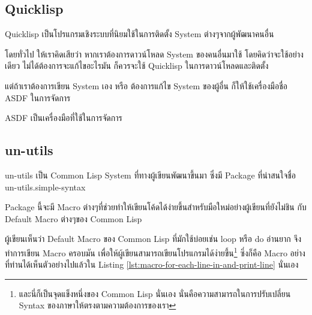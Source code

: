 \documentclass[a4paper]{article}
\begin{document}
\subsection{Quicklisp}

Quicklisp เป็นโปรแกรมเชิงระบบที่นิยมใช้ในการติดตั้ง System ต่างๆจากผู้พัฒนาคนอื่น

โดยทั่วไป ให้เราคิดเสียว่า หากเราต้องการดาวน์โหลด System ของคนอื่นมาใช้
โดยคิดว่าจะใช้อย่างเดียว ไม่ได้ต้องการจะแก้ไขอะไรมัน ก็ควรจะใช้ Quicklisp
ในการดาวน์โหลดและติดตั้ง

แต่ถ้าเราต้องการเขียน System เอง หรือ ต้องการแก้ไข System ของผู้อื่น ก็ให้ใช้เครื่องมือชื่อ
ASDF ในการจัดการ

ASDF เป็นเครื่องมือที่ใช้ในการจัดการ

\subsection{un-utils}

un-utils เป็น Common Lisp System ที่ทางผู้เขียนพัฒนาขึ้นมา ซึ่งมี Package ที่น่าสนใจชื่อ
un-utils.simple-syntax

Package นี้จะมี Macro ต่างๆที่ช่วยทำให้เขียนโค้ดได้ง่ายขึ้นสำหรับมือใหม่อย่างผู้เขียนที่ยังไม่ชิน%
กับ Default Macro ต่างๆของ Common Lisp

ผู้เขียนเห็นว่า Default Macro ของ Common Lisp ที่มักใช้บ่อยเช่น loop หรือ do อ่านยาก%
จึงทำการเขียน Macro ครอบมัน เพื่อให้ผู้เขียนสามารถเขียนโปรแกรมได้ง่ายขึ้น\footnote{%
และนี่ก็เป็นจุดแข็งหนึ่งของ Common Lisp นั่นเอง นั่นคือความสามารถในการปรับเปลี่ยน Syntax
ของภาษาให้ตรงตามความต้องการของเรา} ซึ่งก็คือ Macro อย่างที่ท่านได้เห็นตัวอย่างไปแล้วใน
Listing \ref{lst:macro-for-each-line-in-and-print-line} นั่นเอง
\end{document}
